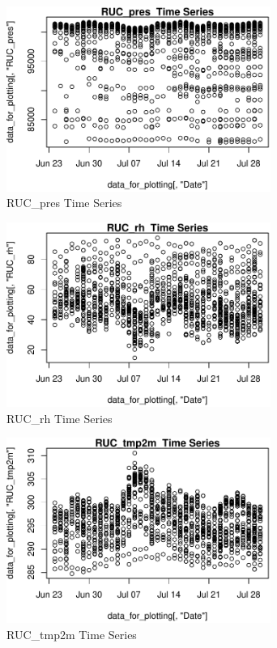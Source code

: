 \begin{figure} 
\centering  
\includegraphics[width=0.77\textwidth]{Code_Outputs/ML_input_report_AllforCaret_cleaned_StepPractice_part_practice_RUC_presTS.pdf} 
\caption{\label{fig:ML_input_report_AllforCaret_cleaned_StepPractice_part_practiceRUC_presTS}RUC_pres  Time Series} 
\end{figure} 
 

\begin{figure} 
\centering  
\includegraphics[width=0.77\textwidth]{Code_Outputs/ML_input_report_AllforCaret_cleaned_StepPractice_part_practice_RUC_rhTS.pdf} 
\caption{\label{fig:ML_input_report_AllforCaret_cleaned_StepPractice_part_practiceRUC_rhTS}RUC_rh  Time Series} 
\end{figure} 
 

\begin{figure} 
\centering  
\includegraphics[width=0.77\textwidth]{Code_Outputs/ML_input_report_AllforCaret_cleaned_StepPractice_part_practice_RUC_tmp2mTS.pdf} 
\caption{\label{fig:ML_input_report_AllforCaret_cleaned_StepPractice_part_practiceRUC_tmp2mTS}RUC_tmp2m  Time Series} 
\end{figure} 
 

